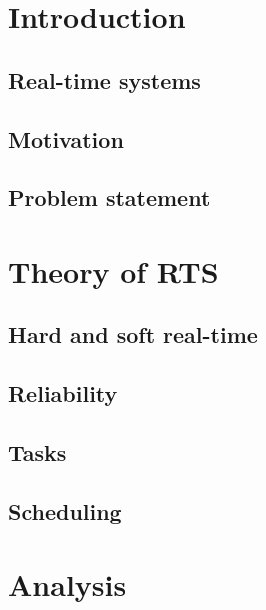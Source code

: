 



\newpage
\thispagestyle{empty}
\mbox{}

\newpage
\newpage
\thispagestyle{empty}
\mbox{}
\tableofcontents
\newpage
\thispagestyle{empty}
\mbox{}
\chapter{Introduction}
\section{Real-time systems}
\section{Motivation}
\section{Problem statement} 


\chapter{Theory of RTS}
\label{chap:rts}
\section{Hard and soft real-time}
\section{Reliability}
\section{Tasks}
\section{Scheduling}


\chapter{Analysis}
\label{AnalChap}
%
